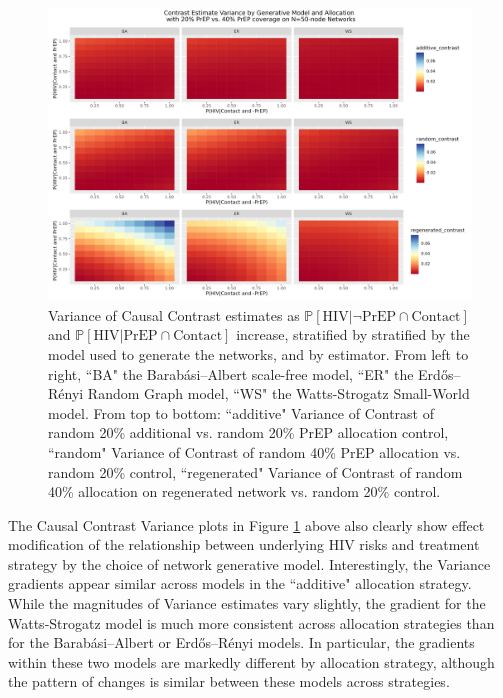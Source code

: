 \documentclass{article}
\theoremstyle{definition}
\begin{document}
\begin{figure}[H]
    \centering
    \includegraphics[width=\linewidth]{Corrected Figures/Generative Model Variance Plot.png}
    \caption{Variance of Causal Contrast estimates as $\mathbb{P}\left[\text{HIV} \vert \neg \text{PrEP} \cap \text{Contact}\right]$ and $\mathbb{P}\left[\text{HIV} \vert \text{PrEP} \cap \text{Contact}\right]$ increase, stratified by stratified by the model used to generate the networks, and by estimator. From left to right, ``BA" the Barabási–Albert scale-free model, ``ER" the Erdős–Rényi Random Graph model, ``WS" the Watts-Strogatz Small-World model. From top to bottom: ``additive" Variance of Contrast of random 20\% additional vs. random 20\% PrEP allocation control, ``random" Variance of Contrast of random 40\% PrEP allocation vs. random 20\% control, ``regenerated" Variance of Contrast of random 40\% allocation on regenerated network vs. random 20\% control.}
    \label{fig:Figure S4.18}
\end{figure}
The Causal Contrast Variance plots in Figure \ref{fig:Figure S4.18} above also clearly show effect modification  of the relationship between underlying HIV risks and treatment strategy by the choice of network generative model.  Interestingly, the Variance gradients appear similar across models in the ``additive" allocation strategy. While the magnitudes of Variance estimates vary slightly, the gradient for the Watts-Strogatz model is much more consistent  across allocation strategies than for the Barabási–Albert or  Erdős–Rényi models. In particular, the gradients within these two models are markedly different by allocation strategy, although the pattern of changes is similar between these models across strategies. 
\end{document}
